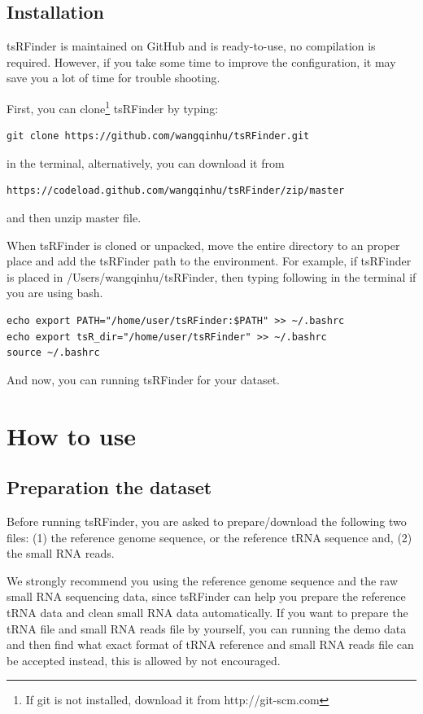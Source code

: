 \documentclass[11pt, a4paper]{article}
\begin{document}
\subsection{Installation}

tsRFinder is maintained on GitHub and is ready-to-use, no compilation is required. However, if you take some time to improve the configuration, it may save you a lot of time for trouble shooting.

First, you can clone\footnote{If git is not installed, download it from http://git-scm.com} tsRFinder by typing:

{\small \begin{verbatim}
git clone https://github.com/wangqinhu/tsRFinder.git
\end{verbatim}}

in the terminal, alternatively, you can download it from

{\small \begin{verbatim}
https://codeload.github.com/wangqinhu/tsRFinder/zip/master
\end{verbatim}
}

and then unzip master file.

When tsRFinder is cloned or unpacked, move the entire directory to an proper place and add the tsRFinder path to the environment. For example, if tsRFinder is placed in /Users/wangqinhu/tsRFinder, then typing following in the terminal if you are using bash.

{\small \begin{verbatim}
echo export PATH="/home/user/tsRFinder:$PATH" >> ~/.bashrc
echo export tsR_dir="/home/user/tsRFinder" >> ~/.bashrc
source ~/.bashrc
\end{verbatim}}

And now, you can running tsRFinder for your dataset.

\section{How to use}

\subsection{Preparation the dataset}

Before running tsRFinder, you are asked to prepare/download the following two files: (1) the reference genome sequence, or the reference tRNA sequence and, (2) the small RNA reads.

We strongly recommend you using the reference genome sequence and the raw small RNA sequencing data, since tsRFinder can help you prepare the reference tRNA data and clean small RNA data automatically. If you want to prepare the tRNA file and small RNA reads file by yourself, you can running the demo data and then find what exact format of tRNA reference and small RNA reads file can be accepted instead, this is allowed by not encouraged. 
\end{document}
